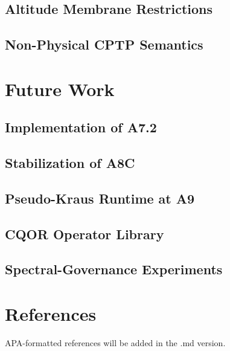 \documentclass[11pt]{article}
\begin{document}
\subsection{Altitude Membrane Restrictions}
\subsection{Non-Physical CPTP Semantics}

\section{Future Work}
\subsection{Implementation of A7.2}
\subsection{Stabilization of A8C}
\subsection{Pseudo-Kraus Runtime at A9}
\subsection{CQOR Operator Library}
\subsection{Spectral-Governance Experiments}

\section{References}
APA-formatted references will be added in the .md version.
\end{document}
